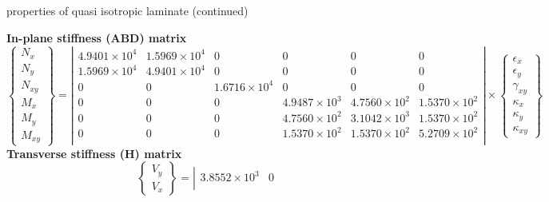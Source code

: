 \documentclass[a4paper,landscape,oneside,11pt,twocolumn]{memoir}
\begin{document}
\begin{table}[!htbp]
  \caption{\label{tab:quasi-isotropic-mat-2}properties of quasi isotropic
  laminate (continued)}
  \renewcommand{\arraystretch}{1.2}
  \setlength{\arraycolsep}{2pt}
  \centering\footnotesize{\rule{0pt}{10pt}
  \vbox{
    \vbox{\small\textbf{In-plane stiffness (ABD) matrix}\\[-3mm]
      \fontsize{6}{6}\selectfont
      \[\left\{\begin{array}{c}
          N_x\\ N_y\\ N_{xy}\\ M_x\\ M_y\\ M_{xy}
        \end{array}\right\} = 
      \left|\begin{array}{cccccc}
           4.9401\times 10^{4} &  1.5969\times 10^{4} & 0 & 0 & 0 & 0\\
           1.5969\times 10^{4} &  4.9401\times 10^{4} & 0 & 0 & 0 & 0\\
          0 & 0 &  1.6716\times 10^{4} & 0 & 0 & 0\\
          0 & 0 & 0 &  4.9487\times 10^{3} &  4.7560\times 10^{2} &  1.5370\times 10^{2}\\
          0 & 0 & 0 &  4.7560\times 10^{2} &  3.1042\times 10^{3} &  1.5370\times 10^{2}\\
          0 & 0 & 0 &  1.5370\times 10^{2} &  1.5370\times 10^{2} &  5.2709\times 10^{2}\\
          \end{array}\right| \times
        \left\{\begin{array}{c}
            \epsilon_x\\[2pt] \epsilon_y\\[2pt] \gamma_{xy}\\[2pt]
            \kappa_x\\[2pt] \kappa_y\\[2pt] \kappa_{xy}
          \end{array}\right\}\]
    }
    \vbox{\small\textbf{Transverse stiffness (H) matrix}\\[-2mm]
      \tiny\[\left\{\begin{array}{c}
          V_y\\ V_x
        \end{array}\right\} = 
      \left|\begin{array}{cc}
           3.8552\times 10^{3} & 0\\

\end{array}\]}}}
\end{table}
\end{document}
